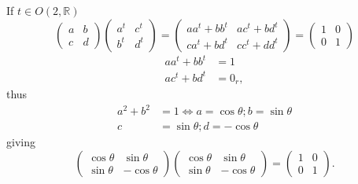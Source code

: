 \documentclass[aps,preprint]{revtex4}
\begin{document}
If $t\in O\left( 2,\mathbb{R}\right) $%
\begin{equation}
\left( 
\begin{array}{cc}
a & b \\ 
c & d%
\end{array}%
\right) \left( 
\begin{array}{cc}
a^{t} & c^{t} \\ 
b^{t} & d^{t}%
\end{array}%
\right) =\left( 
\begin{array}{cc}
aa^{t}+bb^{t} & ac^{t}+bd^{t} \\ 
ca^{t}+bd^{t} & cc^{t}+dd^{t}%
\end{array}%
\right) =\left( 
\begin{array}{cc}
1 & 0 \\ 
0 & 1%
\end{array}%
\right)
\end{equation}%
\begin{align}
aa^{t}+bb^{t}& =1 \\
ac^{t}+bd^{t}& =0_{r},
\end{align}%
thus 
\begin{align}
a^{2}+b^{2}& =1\Leftrightarrow a=\cos \theta ;b=\sin \theta \\
c& =\sin \theta ;d=-\cos \theta
\end{align}%
giving%
\begin{equation}
\left( 
\begin{array}{cc}
\cos \theta & \sin \theta \\ 
\sin \theta & -\cos \theta%
\end{array}%
\right) \left( 
\begin{array}{cc}
\cos \theta & \sin \theta \\ 
\sin \theta & -\cos \theta%
\end{array}%
\right) =\left( 
\begin{array}{cc}
1 & 0 \\ 
0 & 1%
\end{array}%
\right) .
\end{equation}
\end{document}

